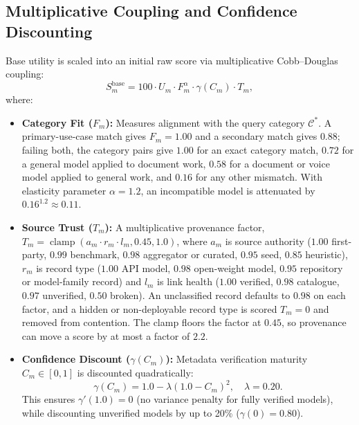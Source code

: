 \documentclass[pdflatex,sn-mathphys-num]{sn-jnl}
\theoremstyle{thmstyleone}
\theoremstyle{thmstylethree}
\begin{document}
\subsection{Multiplicative Coupling and Confidence Discounting}\label{subsec:coupling}

Base utility is scaled into an initial raw score via multiplicative Cobb--Douglas coupling:
\begin{equation}\label{eq:base_score}
S_m^{\text{base}} = 100 \cdot U_m \cdot F_m^\alpha \cdot \gamma(C_m) \cdot T_m,
\end{equation}
where:
\begin{itemize}
  \item \textbf{Category Fit ($F_m$):} Measures alignment with the query category $\mathcal{C}^*$. A primary-use-case match gives $F_m = 1.00$ and a secondary match gives $0.88$; failing both, the category pairs give $1.00$ for an exact category match, $0.72$ for a general model applied to document work, $0.58$ for a document or voice model applied to general work, and $0.16$ for any other mismatch. With elasticity parameter $\alpha = 1.2$, an incompatible model is attenuated by $0.16^{1.2} \approx 0.11$.
  \item \textbf{Source Trust ($T_m$):} A multiplicative provenance factor, $T_m = \operatorname{clamp}(a_m \cdot r_m \cdot l_m, 0.45, 1.0)$, where $a_m$ is source authority ($1.00$ first-party, $0.99$ benchmark, $0.98$ aggregator or curated, $0.95$ seed, $0.85$ heuristic), $r_m$ is record type ($1.00$ API model, $0.98$ open-weight model, $0.95$ repository or model-family record) and $l_m$ is link health ($1.00$ verified, $0.98$ catalogue, $0.97$ unverified, $0.50$ broken). An unclassified record defaults to $0.98$ on each factor, and a hidden or non-deployable record type is scored $T_m = 0$ and removed from contention. The clamp floors the factor at $0.45$, so provenance can move a score by at most a factor of $2.2$.
  \item \textbf{Confidence Discount ($\gamma(C_m)$):} Metadata verification maturity $C_m \in [0, 1]$ is discounted quadratically:
  \begin{equation}\label{eq:confidence}
  \gamma(C_m) = 1.0 - \lambda (1.0 - C_m)^2, \quad \lambda = 0.20.
  \end{equation}
  This ensures $\gamma'(1.0) = 0$ (no variance penalty for fully verified models), while discounting unverified models by up to 20\% ($\gamma(0) = 0.80$).
\end{itemize}
\end{document}
